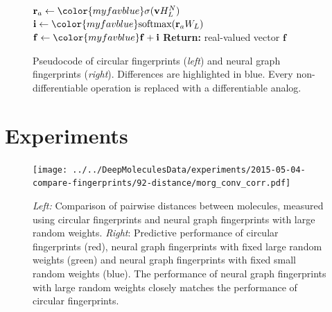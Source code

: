 \documentclass{article}
\newcommand{\vv}{\mathbf{v}}
\newcommand{\vf}{\mathbf{f}}
\newcommand{\vi}{\mathbf{i}}
\newcommand{\vr}{\mathbf{r}}
\begin{document}
\begin{figure}[t]
\begin{minipage}[t]{0.49\columnwidth}
\begin{algorithm}[H]
\begin{algorithmic}[1]
		\State $\vr_a \leftarrow {\color{myfavblue} \sigma(\vv H_L^N)}$ 
		\State $\vi \leftarrow {\color{myfavblue} \textnormal{softmax}(\vr_a W_L)}$ 
		\State $\vf \leftarrow {\color{myfavblue} \vf + \vi}$ 
    \EndFor
\EndFor
\State \textbf{Return:} { {\color{myfavblue} real-valued} vector $\vf$}
\end{algorithmic}
\end{algorithm}
\end{minipage}
\hfill
\caption{Pseudocode of circular fingerprints (\emph{left}) and neural graph fingerprints (\emph{right}).
Differences are highlighted in blue.
Every non-differentiable operation is replaced with a differentiable analog.}
\end{figure}


\section{Experiments}
\label{sec:experiments}


\begin{figure}[h]
\texttt{[image: ../../DeepMoleculesData/experiments/2015-05-04-compare-fingerprints/92-distance/morg\_conv\_corr.pdf]}
\caption{\emph{Left:} Comparison of pairwise distances between molecules, measured using circular fingerprints and neural graph fingerprints with large random weights.
\emph{Right}: Predictive performance of circular fingerprints (red), neural graph fingerprints with fixed large random weights (green) and neural graph fingerprints with fixed small random weights (blue).
The performance of neural graph fingerprints with large random weights closely matches the performance of circular fingerprints.}
\label{fig:fingerprint similarity}
\end{figure}
\end{document}
